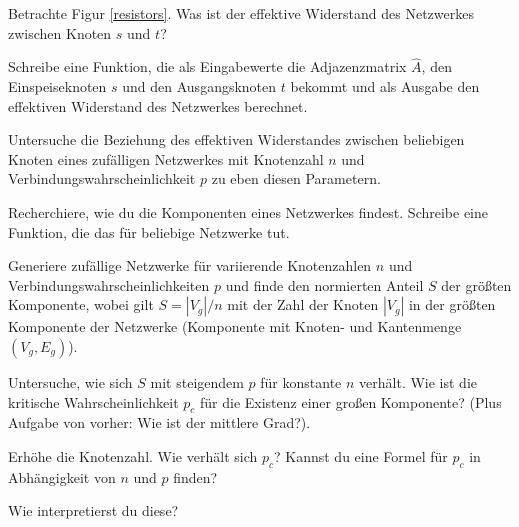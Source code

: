   \exercise[%
  topic = {Effektiver Widerstand}
  ]

 \subexercise[%
  topic={Ausrechnen},
    ]

  Betrachte Figur \ref{resistors}. Was ist der effektive Widerstand 
  des Netzwerkes zwischen Knoten $s$ und $t$?

\begin{figure}[h]
\end{figure}


 \subexercise[%
  topic={Allgemeine Netzwerke von Widerst\"anden $R_0$}
    ]

    Schreibe eine Funktion, die als Eingabewerte die Adjazenzmatrix
    $\hat A$, den Einspeiseknoten $s$ und den Ausgangsknoten $t$
    bekommt und als Ausgabe den effektiven Widerstand des Netzwerkes
    berechnet.

    Untersuche die Beziehung des effektiven Widerstandes zwischen
    beliebigen Knoten eines zuf\"alligen Netzwerkes mit Knotenzahl $n$
    und Verbindungswahrscheinlichkeit $p$ zu eben diesen Parametern.



 \exercise[%
     topic={Zusatz) Perkolation von zuf\"alligen Netzwerken},
    ]
    Recherchiere, wie du die Komponenten eines Netzwerkes findest.
    Schreibe eine Funktion, die das f\"ur beliebige Netzwerke tut.

    Generiere zuf\"allige Netzwerke f\"ur variierende Knotenzahlen
    $n$ und Verbindungs\-wahrscheinlichkeiten $p$ und finde den normierten
    Anteil $S$ der gr\"o\ss{}ten Komponente, wobei gilt $S=|V_g|/n$ mit
    der Zahl der Knoten $|V_g|$ in der gr\"o\ss{}ten Komponente
    der Netzwerke (Komponente mit Knoten- und Kantenmenge
    $(V_g,E_g)$).

    Untersuche, wie sich $S$ mit steigendem $p$ f\"ur konstante $n$
    verh\"alt. Wie ist die kritische Wahrscheinlichkeit $p_c$ f\"ur die
    Existenz einer gro\ss{}en Komponente? (Plus Aufgabe von
    vorher: Wie ist der
    mittlere Grad?). 
    
    Erh\"ohe die Knotenzahl. Wie verh\"alt sich $p_c$? Kannst du eine
    Formel f\"ur $p_c$ in Abh\"angigkeit von $n$ und $p$ finden?

    Wie interpretierst du diese?
	

